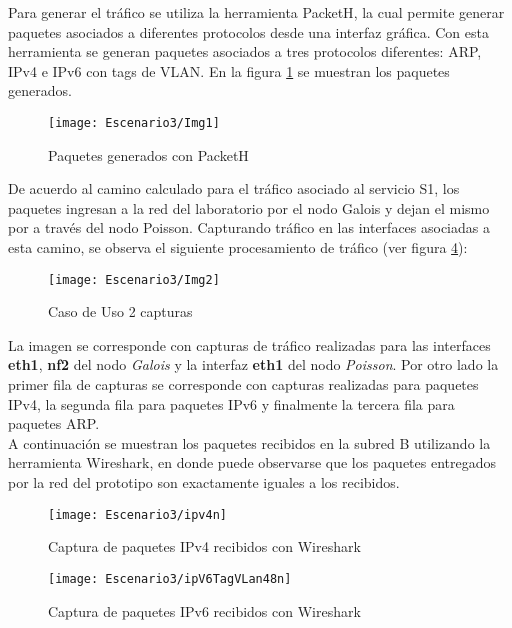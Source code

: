 Para generar el tr\'afico se utiliza la herramienta PacketH\cite{PacketH}, la cual permite generar paquetes asociados a diferentes protocolos desde una interfaz gr\'afica. Con esta herramienta se generan paquetes asociados a tres protocolos diferentes: ARP, IPv4 e IPv6 con tags de VLAN. En la figura \ref{fig:PaquetsSend} se muestran los paquetes generados.\\

\begin{figure}[h!] 
\centering    
\texttt{[image: Escenario3/Img1]}
\caption[Paquetes generados con PacketH]{Paquetes generados con PacketH}
\label{fig:PaquetsSend}
\end{figure}

De acuerdo al camino calculado para el tr\'afico asociado al servicio S1, los paquetes ingresan a la red del laboratorio por el nodo Galois y dejan el mismo por a través del nodo Poisson. Capturando tr\'afico en las interfaces asociadas a esta camino, se observa el siguiente procesamiento de tr\'afico  
 (ver figura \ref{fig:CapturaTCP}):

\begin{figure}[h!] 
\centering    
\texttt{[image: Escenario3/Img2]}
\caption[Caso de Uso 2 capturas]{Caso de Uso 2 capturas}
\label{fig:CapturaTCP}
\end{figure}

La imagen se corresponde con capturas de tr\'afico realizadas para las interfaces \textbf{eth1}, \textbf{nf2} del nodo \textit{Galois} y la interfaz \textbf{eth1} del nodo \textit{Poisson}. Por otro lado la primer fila de capturas se corresponde con capturas realizadas para paquetes IPv4, la segunda fila para paquetes IPv6 y finalmente la tercera fila para paquetes ARP.\\

A continuaci\'on se muestran los paquetes recibidos en la subred B utilizando la herramienta Wireshark, en donde puede observarse que los paquetes entregados por la red del prototipo son exactamente iguales a los recibidos.

\newpage
\begin{figure}[h!] 
\centering    
\texttt{[image: Escenario3/ipv4n]}
\caption[Captura de paquetes IPv4 recibidos con Wireshark]{Captura de paquetes IPv4 recibidos con Wireshark}
\label{fig:CapturaTCP}
\end{figure}

\begin{figure}[h!] 
\centering    
\texttt{[image: Escenario3/ipV6TagVLan48n]}
\caption[Captura de paquetes IPv6 recibidos con Wireshark]{Captura de paquetes IPv6 recibidos con Wireshark}
\label{fig:CapturaTCP}
\end{figure}

